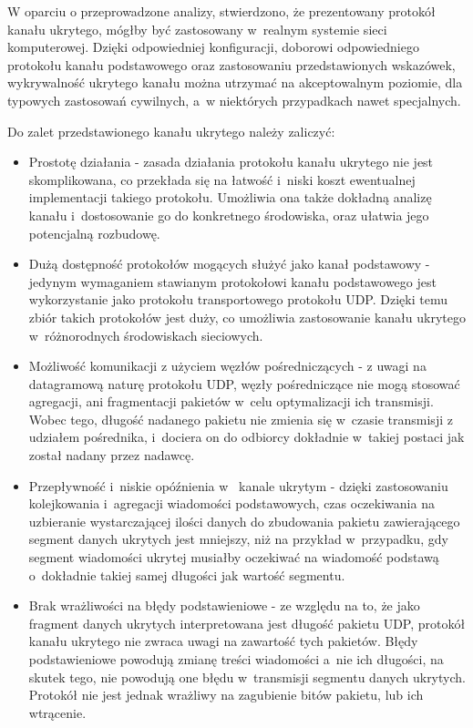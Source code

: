 \documentclass[a4paper, twoside, 12pt]{report}
\begin{document}
    W oparciu o  przeprowadzone analizy, stwierdzono, że prezentowany protokół
    kanału ukrytego, mógłby być zastosowany w~realnym systemie sieci komputerowej.
    Dzięki odpowiedniej konfiguracji, doborowi odpowiedniego protokołu kanału
    podstawowego oraz zastosowaniu przedstawionych wskazówek,
    wykrywalność ukrytego kanału można utrzymać na akceptowalnym
    poziomie, dla typowych zastosowań cywilnych, a~w niektórych przypadkach nawet specjalnych.

    Do zalet przedstawionego kanału ukrytego należy zaliczyć:
    \begin{itemize}
        \item Prostotę działania - zasada działania protokołu kanału ukrytego
            nie jest skomplikowana, co przekłada się na łatwość i~niski koszt
            ewentualnej implementacji takiego protokołu. Umożliwia ona także
            dokładną analizę kanału i~dostosowanie go do konkretnego środowiska,
            oraz ułatwia jego potencjalną rozbudowę.
        \item Dużą dostępność protokołów mogących służyć jako kanał podstawowy -
            jedynym wymaganiem stawianym protokołowi kanału podstawowego jest
            wykorzystanie jako protokołu transportowego protokołu UDP. Dzięki temu
            zbiór takich protokołów jest duży, co umożliwia zastosowanie kanału
            ukrytego w~różnorodnych środowiskach sieciowych.
        \item Możliwość komunikacji z użyciem węzłów pośredniczących - z uwagi
            na datagramową naturę protokołu UDP, węzły pośredniczące nie mogą stosować
            agregacji, ani fragmentacji pakietów w~celu optymalizacji ich transmisji.
            Wobec tego, długość nadanego pakietu nie zmienia się w~czasie transmisji
            z udziałem pośrednika, i~dociera on do odbiorcy dokładnie w~takiej postaci
            jak został nadany przez nadawcę.
        \item Przepływność i~niskie opóźnienia w~ kanale ukrytym - dzięki
            zastosowaniu kolejkowania i~agregacji wiadomości podstawowych,
            czas oczekiwania na uzbieranie wystarczającej ilości danych do zbudowania
            pakietu zawierającego segment danych ukrytych jest mniejszy, niż na przykład
            w~przypadku, gdy segment wiadomości ukrytej musiałby oczekiwać na
            wiadomość podstawą o~dokładnie takiej samej długości jak wartość segmentu.
        \item Brak wrażliwości na błędy podstawieniowe - ze względu na to, że jako
            fragment danych ukrytych interpretowana jest długość pakietu UDP, protokół
            kanału ukrytego nie zwraca uwagi na zawartość tych pakietów.
            Błędy podstawieniowe powodują zmianę treści wiadomości a~nie ich długości, na skutek tego,
            nie powodują one błędu w~transmisji segmentu danych ukrytych. Protokół
            nie jest jednak wrażliwy na zagubienie bitów pakietu, lub ich wtrącenie.
    \end{itemize}
\end{document}
